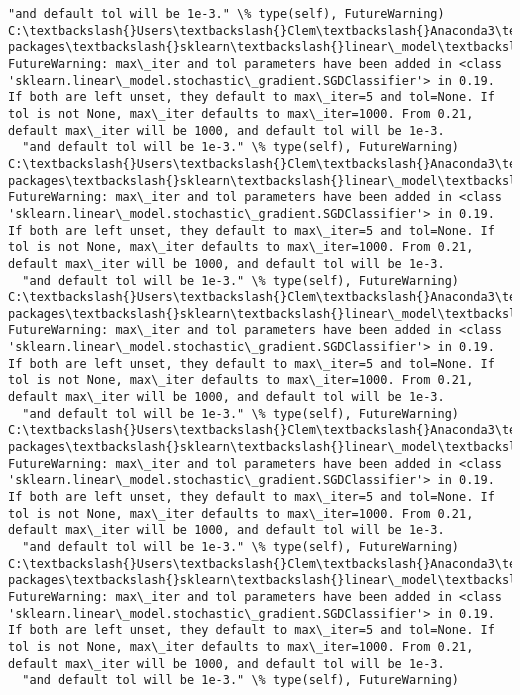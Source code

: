 \documentclass[11pt]{article}
\begin{document}
\begin{Verbatim}[commandchars=\\\{\}]
  "and default tol will be 1e-3." \% type(self), FutureWarning)
C:\textbackslash{}Users\textbackslash{}Clem\textbackslash{}Anaconda3\textbackslash{}lib\textbackslash{}site-packages\textbackslash{}sklearn\textbackslash{}linear\_model\textbackslash{}stochastic\_gradient.py:128: FutureWarning: max\_iter and tol parameters have been added in <class 'sklearn.linear\_model.stochastic\_gradient.SGDClassifier'> in 0.19. If both are left unset, they default to max\_iter=5 and tol=None. If tol is not None, max\_iter defaults to max\_iter=1000. From 0.21, default max\_iter will be 1000, and default tol will be 1e-3.
  "and default tol will be 1e-3." \% type(self), FutureWarning)
C:\textbackslash{}Users\textbackslash{}Clem\textbackslash{}Anaconda3\textbackslash{}lib\textbackslash{}site-packages\textbackslash{}sklearn\textbackslash{}linear\_model\textbackslash{}stochastic\_gradient.py:128: FutureWarning: max\_iter and tol parameters have been added in <class 'sklearn.linear\_model.stochastic\_gradient.SGDClassifier'> in 0.19. If both are left unset, they default to max\_iter=5 and tol=None. If tol is not None, max\_iter defaults to max\_iter=1000. From 0.21, default max\_iter will be 1000, and default tol will be 1e-3.
  "and default tol will be 1e-3." \% type(self), FutureWarning)
C:\textbackslash{}Users\textbackslash{}Clem\textbackslash{}Anaconda3\textbackslash{}lib\textbackslash{}site-packages\textbackslash{}sklearn\textbackslash{}linear\_model\textbackslash{}stochastic\_gradient.py:128: FutureWarning: max\_iter and tol parameters have been added in <class 'sklearn.linear\_model.stochastic\_gradient.SGDClassifier'> in 0.19. If both are left unset, they default to max\_iter=5 and tol=None. If tol is not None, max\_iter defaults to max\_iter=1000. From 0.21, default max\_iter will be 1000, and default tol will be 1e-3.
  "and default tol will be 1e-3." \% type(self), FutureWarning)
C:\textbackslash{}Users\textbackslash{}Clem\textbackslash{}Anaconda3\textbackslash{}lib\textbackslash{}site-packages\textbackslash{}sklearn\textbackslash{}linear\_model\textbackslash{}stochastic\_gradient.py:128: FutureWarning: max\_iter and tol parameters have been added in <class 'sklearn.linear\_model.stochastic\_gradient.SGDClassifier'> in 0.19. If both are left unset, they default to max\_iter=5 and tol=None. If tol is not None, max\_iter defaults to max\_iter=1000. From 0.21, default max\_iter will be 1000, and default tol will be 1e-3.
  "and default tol will be 1e-3." \% type(self), FutureWarning)
C:\textbackslash{}Users\textbackslash{}Clem\textbackslash{}Anaconda3\textbackslash{}lib\textbackslash{}site-packages\textbackslash{}sklearn\textbackslash{}linear\_model\textbackslash{}stochastic\_gradient.py:128: FutureWarning: max\_iter and tol parameters have been added in <class 'sklearn.linear\_model.stochastic\_gradient.SGDClassifier'> in 0.19. If both are left unset, they default to max\_iter=5 and tol=None. If tol is not None, max\_iter defaults to max\_iter=1000. From 0.21, default max\_iter will be 1000, and default tol will be 1e-3.
  "and default tol will be 1e-3." \% type(self), FutureWarning)

    \end{Verbatim}
\end{document}
